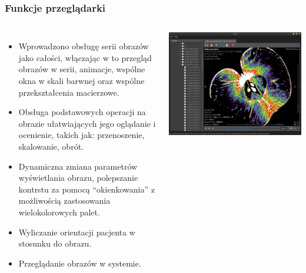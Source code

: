 \documentclass[aspectratio=169]{beamer}
\begin{document}
\begin{frame}[t]
    \frametitle{Funkcje przeglądarki}
    \begin{columns}[T]
        \footnotesize
        \begin{itemize}
            \item Wprowadzono obsługę serii obrazów jako całości, włączając w to przegląd obrazów w serii, animacje, wspólne okna w skali barwnej oraz wspólne przekształcenia macierzowe.
            \item Obsługa podstawowych operacji na obrazie ułatwiających jego oglądanie i ocenienie, takich jak: przenoszenie, skalowanie, obrót.
            \item Dynamiczna zmiana parametrów wyświetlania obrazu, polepszanie kontrstu za pomocą \enquote{okienkowania} z możliwością zastosowania wielokolorowych palet.
            \item Wyliczanie orientacji pacjenta w stosunku do obrazu.
            \item Przeglądanie obrazów w systemie.
        \end{itemize}

        \includegraphics[width=\textwidth]{img/test004.png}
    \end{columns}
\end{frame}
\end{document}
